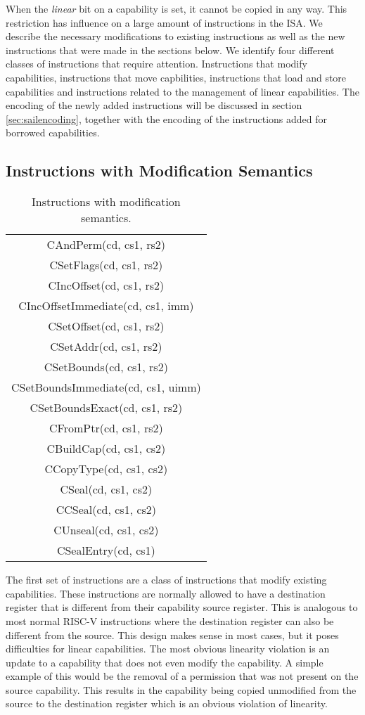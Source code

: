 
When the \textit{linear} bit on a capability is set, it cannot be copied in any way. This restriction has influence on a large amount of instructions in the ISA. We describe the necessary modifications to existing instructions as well as the new instructions that were made in the sections below. We identify four different classes of instructions that require attention. Instructions that modify capabilities, instructions that move capbilities, instructions that load and store capabilities and instructions related to the management of linear capabilities. The encoding of the newly added instructions will be discussed in section \ref{sec:sailencoding}, together with the encoding of the instructions added for borrowed capabilities.

\subsection{Instructions with Modification Semantics}
\begin{table}[h]
\centering
\begin{tabular}{| c |}
\hline
 CAndPerm(cd, cs1, rs2) \\
 CSetFlags(cd, cs1, rs2) \\
 CIncOffset(cd, cs1, rs2) \\
 CIncOffsetImmediate(cd, cs1, imm) \\
 CSetOffset(cd, cs1, rs2) \\
 CSetAddr(cd, cs1, rs2) \\
 CSetBounds(cd, cs1, rs2) \\
 CSetBoundsImmediate(cd, cs1, uimm) \\
 CSetBoundsExact(cd, cs1, rs2) \\
 CFromPtr(cd, cs1, rs2) \\
 CBuildCap(cd, cs1, cs2) \\
 CCopyType(cd, cs1, cs2) \\
 CSeal(cd, cs1, cs2) \\
 CCSeal(cd, cs1, cs2) \\
 CUnseal(cd, cs1, cs2) \\
 CSealEntry(cd, cs1) \\
\hline
\end{tabular}
\caption{Instructions with modification semantics.}
\label{table:lininstmod}
\end{table}
The first set of instructions are a class of instructions that modify existing capabilities. These instructions are normally allowed to have a destination register that is different from their capability source register. This is analogous to most normal RISC-V instructions where the destination register can also be different from the source. This design makes sense in most cases, but it poses difficulties for linear capabilities. The most obvious linearity violation is an update to a capability that does not even modify the capability. A simple example of this would be the removal of a permission that was not present on the source capability. This results in the capability being copied unmodified from the source to the destination register which is an obvious violation of linearity.

